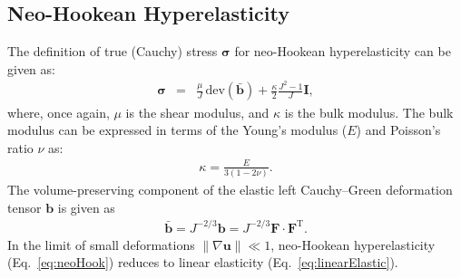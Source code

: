 \documentclass[review,3p]{elsarticle}
\newcommand{\bb}{\boldsymbol}
\begin{document}
\subsection{Neo-Hookean Hyperelasticity}
\label{app:mechLaws:NH}
%
The definition of true (Cauchy) stress $\bb{\sigma}$ for neo-Hookean hyperelasticity can be given as:
\begin{eqnarray} \label{eq:neoHook}
	\bb{\sigma}
	&=& \frac{\mu}{J} \, \text{dev} \left( \bar{\bb{b}} \right) + \frac{\kappa}{2} \frac{J^2 - 1}{J} \bb{I},
\end{eqnarray}
where, once again, $\mu$ is the shear modulus, and $\kappa$ is the bulk modulus.
The bulk modulus can be expressed in terms of the Young's modulus ($E$) and Poisson's ratio $\nu$ as:
\begin{eqnarray}
	\kappa = \frac{E}{3(1 - 2\nu)}.
\end{eqnarray}
The volume-preserving component of the elastic left Cauchy--Green deformation tensor $\boldsymbol{b}$ is given as
\begin{eqnarray}
	\bar{\bb{b}} = J^{-2/3} \bb{b} = J^{-2/3} \bb{F} \cdot \bb{F}^{\text{T}}.
\end{eqnarray}
In the limit of small deformations $\lVert \nabla \mathbf{u} \rVert  \ll 1$, neo-Hookean hyperelasticity (Eq.~\eqref{eq:neoHook}) reduces to linear elasticity (Eq.~\eqref{eq:linearElastic}).
\iffalse
%
\end{document}

